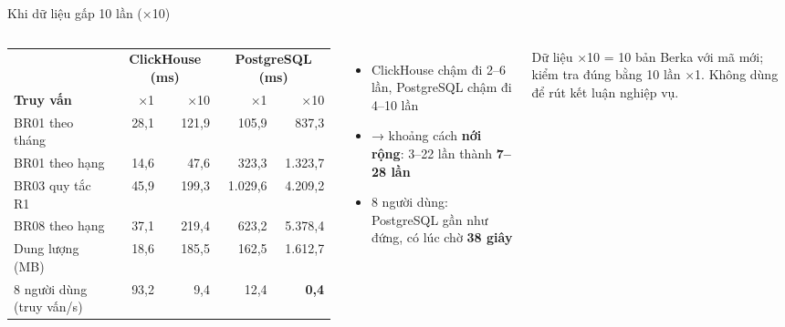 \documentclass[aspectratio=169,11pt]{beamer}
\begin{document}
\begin{frame}{Khi dữ liệu gấp 10 lần (×10)}
  \begin{columns}[T]
    \scriptsize
    \setlength{\tabcolsep}{3pt}
    \begin{tabular}{l r r r r}
      \toprule
      & \multicolumn{2}{c}{\textbf{ClickHouse (ms)}} & \multicolumn{2}{c}{\textbf{PostgreSQL (ms)}} \\
      \cmidrule(lr){2-3}\cmidrule(lr){4-5}
      \textbf{Truy vấn} & ×1 & ×10 & ×1 & ×10 \\
      \midrule
      BR01 theo tháng & 28,1 & 121,9 & 105,9 & 837,3 \\
      BR01 theo hạng & 14,6 & 47,6 & 323,3 & 1.323,7 \\
      BR03 quy tắc R1 & 45,9 & 199,3 & 1.029,6 & 4.209,2 \\
      BR08 theo hạng & 37,1 & 219,4 & 623,2 & 5.378,4 \\
      \midrule
      Dung lượng (MB) & 18,6 & 185,5 & 162,5 & 1.612,7 \\
      8 người dùng (truy vấn/s) & 93,2 & 9,4 & 12,4 & \textbf{0,4} \\
      \bottomrule
    \end{tabular}
    \small
    \begin{itemize}
      \item ClickHouse chậm đi 2--6 lần, PostgreSQL chậm đi 4--10 lần
      \item → khoảng cách \textbf{nới rộng}: 3--22 lần thành \textbf{7--28 lần}
      \item 8 người dùng: PostgreSQL gần như đứng, có lúc chờ \textbf{38 giây}
    \end{itemize}
    \footnotesize Dữ liệu ×10 = 10 bản Berka với mã mới; kiểm tra đúng bằng 10 lần ×1. Không dùng để rút kết luận nghiệp vụ.
  \end{columns}
\end{frame}
\end{document}
